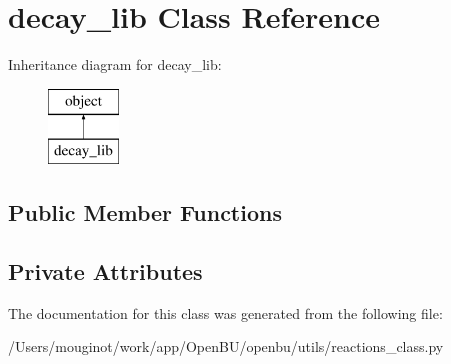 \hypertarget{classopenbu_1_1utils_1_1reactions__class_1_1decay__lib}{}\section{decay\+\_\+lib Class Reference}
\label{classopenbu_1_1utils_1_1reactions__class_1_1decay__lib}
Inheritance diagram for decay\+\_\+lib\+:\begin{figure}[H]
\begin{center}
\leavevmode
\includegraphics[height=2.000000cm]{classopenbu_1_1utils_1_1reactions__class_1_1decay__lib}
\end{center}
\end{figure}
\subsection*{Public Member Functions}
\subsection*{Private Attributes}


The documentation for this class was generated from the following file\+:\begin{DoxyCompactItemize}
\item 
/\+Users/mouginot/work/app/\+Open\+B\+U/openbu/utils/reactions\+\_\+class.\+py\end{DoxyCompactItemize}
